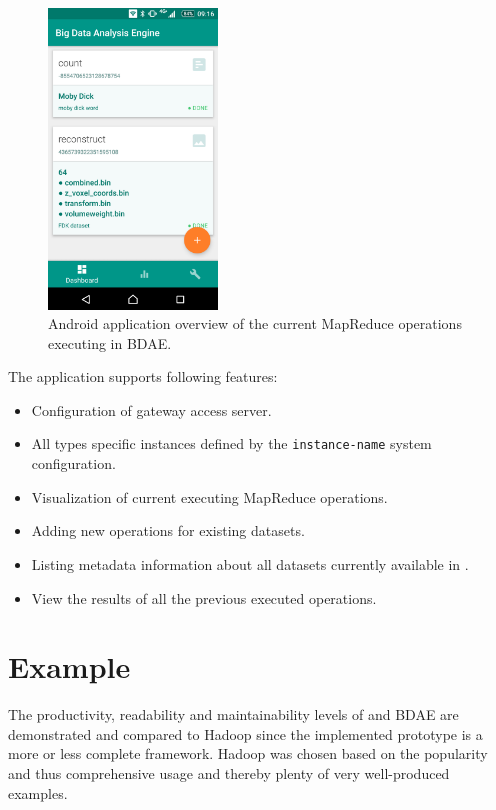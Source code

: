\begin{figure}[h!]
	\centering
	\vspace*{4mm}
	\includegraphics[width=0.4\textwidth]{img/overview.png}
	\caption[Android application overview]{Android application overview of the current MapReduce operations executing in BDAE. \label{fig:app-overview}}
	\vspace*{4mm}
\end{figure}

\noindent
The application supports following features:
\begin{itemize}
	\item Configuration of gateway access server.
	\item All types \CodeName specific instances defined by the \texttt{instance-name} system configuration.
	\item Visualization of current executing MapReduce operations.
	\item Adding new operations for existing datasets.
	\item Listing metadata information about all datasets currently available in \CodeName.
	\item View the results of all the previous executed operations.
\end{itemize}

\section{Example}
The productivity, readability and maintainability levels of \CodeName and BDAE are demonstrated and compared to Hadoop since the implemented prototype is a more or less complete framework. Hadoop was chosen based on the popularity and thus comprehensive usage and thereby plenty of very well-produced examples.
\newline

